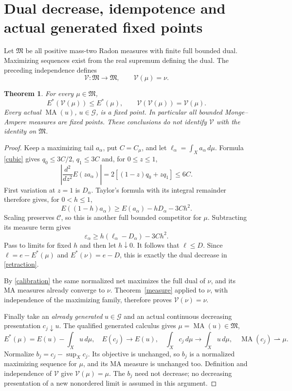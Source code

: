 \documentclass[11pt]{article}
\newtheorem{theorem}{Theorem}
\newcommand{\C}{\mathcal C}
\newcommand{\G}{\mathcal G}
\newcommand{\MA}{\operatorname{MA}}
\begin{document}
\section{Dual decrease, idempotence and actual generated fixed points}
Let $\mathfrak M$ be all positive mass-two Radon measures with
finite full bounded dual. Maximizing sequences exist from the real
supremum defining the dual. The preceding independence defines
\[
 \mathcal V:\mathfrak M\longrightarrow\mathfrak M,
 \qquad \mathcal V(\mu)=\nu.
\]
\begin{theorem}\label{retract}
For every $\mu\in\mathfrak M$,
\begin{equation}\label{retraction}
 E^*(\mathcal V(\mu))\le E^*(\mu),\qquad
 \mathcal V(\mathcal V(\mu))=\mathcal V(\mu).
\end{equation}
Every actual $\MA(u)$, $u\in\G$, is a fixed point. In particular
all bounded Monge--Ampere measures are fixed points. These conclusions
do not identify $\mathcal V$ with the identity on $\mathfrak M$.
\end{theorem}
\begin{proof}
Keep a maximizing tail $a_\alpha$, put $C=C_\mu$, and let
$\ell_\alpha=\int_Xa_\alpha\,d\mu$. Formula \eqref{cubic}
gives $q_0\le3C/2$, $q_1\le3C$ and, for $0\le z\le1$,
\[
 \left|\frac{d^2}{dz^2}E(za_\alpha)\right|
      =2[(1-z)q_0+zq_1]\le6C.
\]
First variation at $z=1$ is $D_\alpha$. Taylor's formula with
its integral remainder therefore gives, for $0<h\le1$,
\[
 E((1-h)a_\alpha)\ge E(a_\alpha)-hD_\alpha-3Ch^2.
\]
Scaling preserves $\C$, so this is another full bounded competitor
for $\mu$. Subtracting its measure term gives
\[
 \varepsilon_\alpha\ge
     h(\ell_\alpha-D_\alpha)-3Ch^2.
\]
Pass to limits for fixed $h$ and then let $h\downarrow0$.
It follows that $\ell\le D$. Since
$\ell=e-E^*(\mu)$ and $E^*(\nu)=e-D$, this is exactly
the dual decrease in \eqref{retraction}.

By \eqref{calibration} the same normalized net maximizes the
full dual of $\nu$, and its MA measures already converge to $\nu$.
Theorem~\ref{measure} applied to $\nu$, with independence of
the maximizing family, therefore proves $\mathcal V(\nu)=\nu$.

Finally take an \emph{already generated} $u\in\G$ and an
actual continuous decreasing presentation $c_j\downarrow u$.
The qualified generated calculus gives $\mu=\MA(u)\in\mathfrak M$,
\[
 E^*(\mu)=E(u)-\int_Xu\,d\mu,
 \quad E(c_j)\to E(u),\quad
 \int_Xc_j\,d\mu\to\int_Xu\,d\mu,\quad
 \MA(c_j)\rightharpoonup\mu.
\]
Normalize $b_j=c_j-\sup_Xc_j$. Its objective is unchanged,
so $b_j$ is a normalized maximizing sequence for $\mu$, and its
MA measure is unchanged too. Definition and independence of
$\mathcal V$ give $\mathcal V(\mu)=\mu$.
The $b_j$ need not decrease; no decreasing presentation of a new
nonordered limit is assumed in this argument.
\end{proof}
\end{document}
